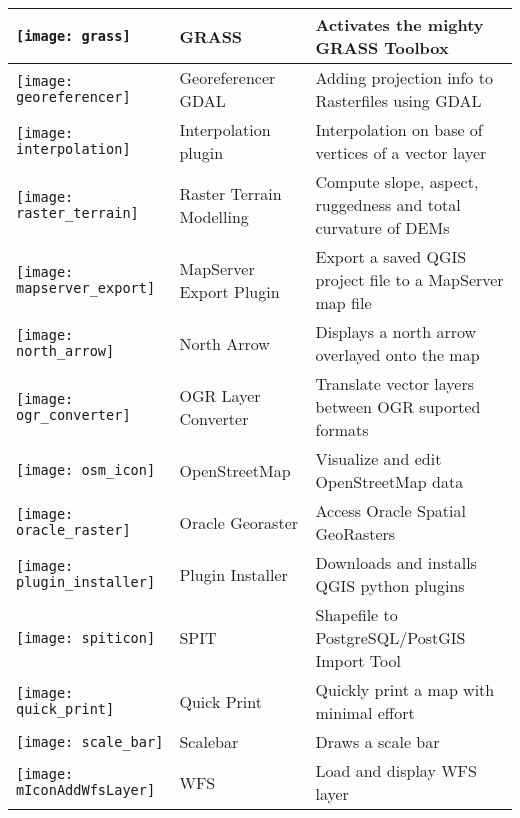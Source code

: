 {\begin{longtable}{|p{1.2cm}|p{3.8cm}|p{10.5cm}|}
\hline
\texttt{[image: grass]}
 & GRASS \index{plugin!grass toolbox} & Activates the mighty GRASS Toolbox\\
\hline
\texttt{[image: georeferencer]}
 & Georeferencer GDAL \index{plugin!georeferencer} & Adding projection info to Rasterfiles using GDAL\\
\hline
\texttt{[image: interpolation]}
& Interpolation plugin \index{plugins!Interpolation}& Interpolation on base of vertices of a vector layer\\
\hline
\texttt{[image: raster\_terrain]}
& Raster Terrain Modelling \index{plugins!Raster Terrain Modelling}& Compute slope, aspect,
ruggedness and total curvature of DEMs\\
\hline
\texttt{[image: mapserver\_export]}
& MapServer Export Plugin \index{plugins!MapServer Export}& Export a saved QGIS project file to a MapServer map file \\
\hline
\texttt{[image: north\_arrow]}
& North Arrow \index{plugins!north arrow}& Displays a north arrow overlayed onto the map\\
\hline
\texttt{[image: ogr\_converter]}
 & OGR Layer Converter \index{plugins!OGR converter} & Translate vector
layers between OGR suported formats\\
\hline
\texttt{[image: osm\_icon]}
 & OpenStreetMap & Visualize and edit OpenStreetMap data \\
\hline
\texttt{[image: oracle\_raster]}
 & Oracle Georaster \index{plugins!georaster}& Access Oracle Spatial GeoRasters\\
\hline
\texttt{[image: plugin\_installer]}
 & Plugin Installer \index{plugins!Plugin Installer} & Downloads and installs QGIS python plugins\\
\hline
\texttt{[image: spiticon]}
 & SPIT \index{plugins!spit}& Shapefile to PostgreSQL/PostGIS Import Tool \\
\hline
\texttt{[image: quick\_print]}
 & Quick Print \index{plugins!quick print}& Quickly print a map with minimal
effort \\
\hline
\texttt{[image: scale\_bar]}
 & Scalebar \index{plugins!scalebar}& Draws a scale bar\\
\hline
\texttt{[image: mIconAddWfsLayer]}
 & WFS & Load and display WFS layer \\
\hline
\end{longtable}}
